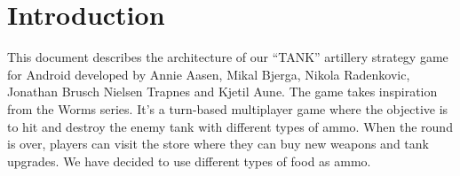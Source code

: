 \chapter{Introduction}
This document describes the architecture of our “TANK” artillery strategy game for Android developed by Annie Aasen, Mikal Bjerga, Nikola Radenkovic, Jonathan Brusch Nielsen Trapnes and Kjetil Aune. The game takes inspiration from the Worms series. It’s a turn-based multiplayer game where the objective is to hit and destroy the enemy tank with different types of ammo. When the round is over, players can visit the store where they can buy new weapons and tank upgrades. We have decided to use different types of food as ammo.
